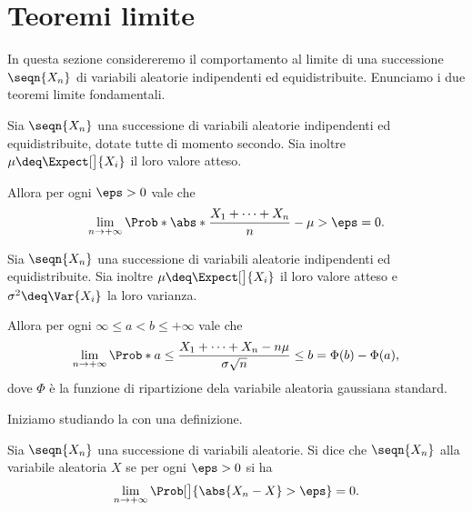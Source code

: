 
\section{Teoremi limite}

In questa sezione considereremo il comportamento al limite di una successione $\seqn{X_n}$ di variabili aleatorie indipendenti ed equidistribuite. Enunciamo i due teoremi limite fondamentali.

\begin{theorem}
    \label{th:law_large_numbers}
    Sia $\seqn{X_n}$ una successione di variabili aleatorie indipendenti ed equidistribuite, dotate tutte di momento secondo. Sia inoltre $\mu \deq \Expect[\big]{X_i}$ il loro valore atteso.

    Allora per ogni $\eps > 0$ vale che \begin{equation}
        \lim_{n \to +\infty} \Prob*{\abs*{\frac{X_1 + \dots + X_n}{n} - \mu} > \eps} = 0.    
    \end{equation}
\end{theorem}

\begin{theorem}
    \label{th:central_limit}
    Sia $\seqn{X_n}$ una successione di variabili aleatorie indipendenti ed equidistribuite. Sia inoltre $\mu \deq \Expect[\big]{X_i}$ il loro valore atteso e $\sigma^2 \deq \Var{X_i}$ la loro varianza.

    Allora per ogni $\infty \leq a < b \leq +\infty$ vale che \begin{equation}
        \lim_{n \to +\infty} \Prob*{a \leq \frac{X_1 + \dots + X_n - n\mu}{\sigma\sqrt{n}} \leq b} = \Phi(b) - \Phi(a),  
    \end{equation}
    dove $\Phi$ è la funzione di ripartizione dela variabile aleatoria gaussiana standard.
\end{theorem}

Iniziamo studiando la  con una definizione.
\begin{definition}
    Sia $\seqn{X_n}$ una successione di variabili aleatorie. Si dice che $\seqn{X_n}$  alla variabile aleatoria $X$ se per ogni $\eps > 0$ si ha \[
        \lim_{n \to +\infty} \Prob[\big]{\abs{X_n - X} > \eps} = 0.    
    \]
\end{definition}


